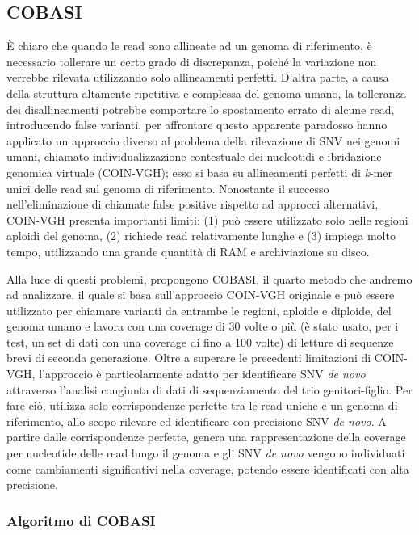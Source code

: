 \documentclass[../main.tex]{subfiles}
\begin{document}
\subsection{COBASI}
\label{cobasi}
 
È chiaro che quando le read sono allineate ad un genoma di riferimento, è necessario tollerare un certo grado di discrepanza, poiché la variazione non verrebbe rilevata utilizzando solo allineamenti perfetti. D'altra parte, a causa della struttura altamente ripetitiva e complessa del genoma umano, la tolleranza dei disallineamenti potrebbe comportare lo spostamento errato di alcune read, introducendo false varianti.  \cite{gomez-romero2018cobasi} per affrontare questo apparente paradosso hanno applicato un approccio diverso al problema della rilevazione di SNV nei genomi umani, chiamato individualizzazione contestuale dei nucleotidi e ibridazione genomica virtuale (COIN-VGH); esso si basa su allineamenti perfetti di \textit{k}-mer unici delle read sul genoma di riferimento. Nonostante il successo nell'eliminazione di chiamate false positive rispetto ad approcci alternativi, COIN-VGH presenta importanti limiti: (1) può essere utilizzato solo nelle regioni aploidi del genoma, (2) richiede read relativamente lunghe e (3) impiega molto tempo,  utilizzando una grande quantità di RAM e archiviazione su disco.

Alla luce di questi problemi, \cite{gomez-romero2018cobasi} propongono COBASI, il quarto metodo che andremo ad analizzare, il quale si basa sull'approccio COIN-VGH originale e può essere utilizzato per chiamare varianti da entrambe le regioni, aploide e diploide, del genoma umano e lavora con una coverage di 30 volte o più (è stato usato, per i test, un set di dati con una coverage di fino a 100 volte) di letture di sequenze brevi di seconda generazione. Oltre a superare le precedenti limitazioni di COIN-VGH, l'approccio è particolarmente adatto per identificare SNV \textit{de novo} attraverso l'analisi congiunta di dati di sequenziamento del trio genitori-figlio. Per fare ciò, utilizza solo corrispondenze perfette tra le read uniche e un genoma di riferimento, allo scopo rilevare ed identificare con precisione SNV \textit{de novo}. A partire dalle corrispondenze perfette, genera una rappresentazione della coverage per nucleotide delle read lungo il genoma e gli SNV \textit{de novo} vengono individuati come cambiamenti significativi nella coverage, potendo essere identificati con alta precisione.  


\subsubsection{Algoritmo di COBASI}
\end{document}
